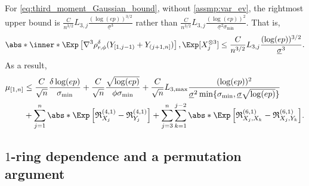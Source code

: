 \documentclass[aos]{imsart}
\begin{document}
For \cref{eq:third_moment_Gaussian_bound}, without \eqref{assmp:var_ev}, the rightmost upper bound is $\frac{C}{n^{3/2}} L_{3,j} \frac{(\log(ep))^{3/2}}{\underline{\sigma}^3}$ rather than $\frac{C}{n^{3/2}} L_{3,j} \frac{(\log(ep))^2}{\underline{\sigma}^2 \sigma_{\min}}$. That is,
\begin{equation*}
\begin{aligned}
    \abs*{ \inner*{ 
        \Exp\left[ \nabla^3 \rho_{r,\phi}^\delta(Y_{[1,j-1)} + Y_{(j+1,n]}) \right], 
        \Exp[X_j^{\otimes 3}] } }
    & \leq \frac{C}{n^{3/2}} L_{3,j} \frac{(\log(ep))^{3/2}}{\underline{\sigma}^3}. \\
\end{aligned}
\end{equation*} 
As a result, 
\begin{equation*}
\begin{aligned}
    \mu_{[1,n]}
    & \leq \frac{C}{\sqrt{n}} \frac{\delta \log(ep)}{\sigma_{\min}}  
    + \frac{C}{\sqrt{n}} \frac{\sqrt{\log(ep)}}{\phi \sigma_{\min}} 
    + \frac{C}{\sqrt{n}} L_{3,\max} \frac{(\log(ep))^{2}}{\underline{\sigma}^2 \min\{\sigma_{\min}, \underline{\sigma} \sqrt{\log(ep)}\}} \\
    & + \sum_{j=1}^{n} \abs*{ \Exp \left[ \mathfrak{R}_{X_j}^{(4,1)} 
        - \mathfrak{R}_{Y_j}^{(4,1)} \right] }
    + \sum_{j=3}^{n} \sum_{k=1}^{j-2} \abs*{ \Exp \left[ 
        \mathfrak{R}_{X_j,X_k}^{(6,1)}
        - \mathfrak{R}_{X_j,Y_k}^{(6,1)}
    \right] }.
\end{aligned}
\end{equation*}









\subsection{\texorpdfstring{$1$}{1}-ring dependence and a permutation argument}
\label{sec:permutation_argument}
\end{document}
